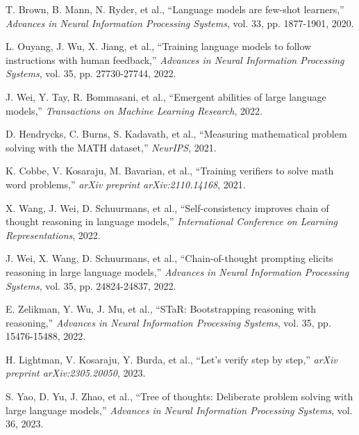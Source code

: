\documentclass[10pt,twocolumn]{article}
\begin{document}
\begin{thebibliography}{99}

T. Brown, B. Mann, N. Ryder, et al., ``Language models are few-shot learners,'' \emph{Advances in Neural Information Processing Systems}, vol. 33, pp. 1877-1901, 2020.

L. Ouyang, J. Wu, X. Jiang, et al., ``Training language models to follow instructions with human feedback,'' \emph{Advances in Neural Information Processing Systems}, vol. 35, pp. 27730-27744, 2022.

J. Wei, Y. Tay, R. Bommasani, et al., ``Emergent abilities of large language models,'' \emph{Transactions on Machine Learning Research}, 2022.

D. Hendrycks, C. Burns, S. Kadavath, et al., ``Measuring mathematical problem solving with the MATH dataset,'' \emph{NeurIPS}, 2021.

K. Cobbe, V. Kosaraju, M. Bavarian, et al., ``Training verifiers to solve math word problems,'' \emph{arXiv preprint arXiv:2110.14168}, 2021.

X. Wang, J. Wei, D. Schuurmans, et al., ``Self-consistency improves chain of thought reasoning in language models,'' \emph{International Conference on Learning Representations}, 2022.

J. Wei, X. Wang, D. Schuurmans, et al., ``Chain-of-thought prompting elicits reasoning in large language models,'' \emph{Advances in Neural Information Processing Systems}, vol. 35, pp. 24824-24837, 2022.

E. Zelikman, Y. Wu, J. Mu, et al., ``STaR: Bootstrapping reasoning with reasoning,'' \emph{Advances in Neural Information Processing Systems}, vol. 35, pp. 15476-15488, 2022.

H. Lightman, V. Kosaraju, Y. Burda, et al., ``Let's verify step by step,'' \emph{arXiv preprint arXiv:2305.20050}, 2023.

S. Yao, D. Yu, J. Zhao, et al., ``Tree of thoughts: Deliberate problem solving with large language models,'' \emph{Advances in Neural Information Processing Systems}, vol. 36, 2023.

\end{thebibliography}
\end{document}
